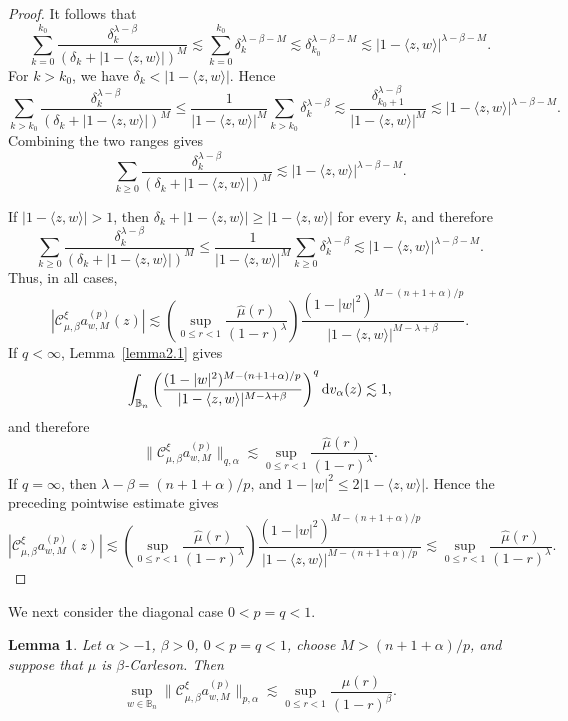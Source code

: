 \documentclass[preprint,12pt,times]{elsarticle}
\newtheorem{lemma}[theorem]{Lemma}
\theoremstyle{definition}
\theoremstyle{remark}
\numberwithin{equation}{section}
\begin{document}
\begin{proof}
\)
It follows that
\[
  \sum_{k=0}^{k_0}
  \frac{\delta_k^{\lambda-\beta}}{(\delta_k+|1-\langle z,w\rangle|)^M}
  \lesssim \sum_{k=0}^{k_0}\delta_k^{\lambda-\beta-M}
  \lesssim \delta_{k_0}^{\lambda-\beta-M}
  \lesssim |1-\langle z,w\rangle|^{\lambda-\beta-M}.
\]
For \(k>k_0\), we have
\(\delta_k<|1-\langle z,w\rangle|\). Hence
\[
  \sum_{k>k_0}
  \frac{\delta_k^{\lambda-\beta}}{(\delta_k+|1-\langle z,w\rangle|)^M}
  \le \frac{1}{|1-\langle z,w\rangle|^M}\sum_{k>k_0}\delta_k^{\lambda-\beta}
  \lesssim \frac{\delta_{k_0+1}^{\lambda-\beta}}{|1-\langle z,w\rangle|^M}
  \lesssim |1-\langle z,w\rangle|^{\lambda-\beta-M}.
\]
Combining the two ranges gives
\[
  \sum_{k\ge0}
  \frac{\delta_k^{\lambda-\beta}}{(\delta_k+|1-\langle z,w\rangle|)^M}
  \lesssim
  |1-\langle z,w\rangle|^{\lambda-\beta-M}.
\]

If \(|1-\langle z,w\rangle|>1\), then
\(\delta_k+|1-\langle z,w\rangle|
 \ge |1-\langle z,w\rangle|\) for every \(k\), and therefore
\[
  \sum_{k\ge0}
  \frac{\delta_k^{\lambda-\beta}}{(\delta_k+|1-\langle z,w\rangle|)^M}
  \le \frac{1}{|1-\langle z,w\rangle|^M}\sum_{k\ge0}\delta_k^{\lambda-\beta}
  \lesssim |1-\langle z,w\rangle|^{\lambda-\beta-M}.
\]
Thus, in all cases,
\[
  |\mathcal C_{\mu,\beta}^{\xi}a_{w,M}^{(p)}(z)|
  \lesssim
  \left(
    \sup_{0\le r<1}
    \frac{\widehat\mu(r)}{(1-r)^\lambda}
  \right)
  \frac{(1-|w|^2)^{M-(n+1+\alpha)/p}}{|1-\langle z,w\rangle|^{M-\lambda+\beta}}.
\]
If \(q<\infty\), Lemma~\ref{lemma2.1} gives
\[
  \int_{\mathbb B_n}
  \left(
    \frac{(1-|w|^2)^{M-(n+1+\alpha)/p}}{|1-\langle z,w\rangle|^{M-\lambda+\beta}}
  \right)^q
  {\rm d}v_\alpha(z)\lesssim1,
\]
and therefore
\[
  \|\mathcal C_{\mu,\beta}^{\xi}a_{w,M}^{(p)}\|_{q,\alpha}
  \lesssim
  \sup_{0\le r<1}\frac{\widehat\mu(r)}{(1-r)^\lambda}.
\]
If \(q=\infty\), then \(\lambda-\beta=(n+1+\alpha)/p\), and
\(1-|w|^2\le2|1-\langle z,w\rangle|\). Hence the preceding pointwise estimate gives
\[
  |\mathcal C_{\mu,\beta}^{\xi}a_{w,M}^{(p)}(z)|
  \lesssim
  \left(\sup_{0\le r<1}\frac{\widehat\mu(r)}{(1-r)^\lambda}\right)
  \frac{(1-|w|^2)^{M-(n+1+\alpha)/p}}{|1-\langle z,w\rangle|^{M-(n+1+\alpha)/p}}
  \lesssim
  \sup_{0\le r<1}\frac{\widehat\mu(r)}{(1-r)^\lambda}.
\]
\end{proof}

We next consider the diagonal case $0<p=q<1$. 


\begin{lemma}\label{lemma3.4}
Let \(\alpha>-1\), \(\beta>0\), \(0<p=q<1\), choose
\(M>(n+1+\alpha)/p\), and suppose that \(\mu\)
is \(\beta\)-Carleson. Then
\[
    \sup_{w\in\mathbb B_n}
    \|\mathcal C_{\mu,\beta}^{\xi}a_{w,M}^{(p)}\|_{p,\alpha}
    \lesssim
    \sup_{0\leq r<1}\frac{\widehat\mu(r)}{(1-r)^\beta}.
\]
\end{lemma}
\end{document}
